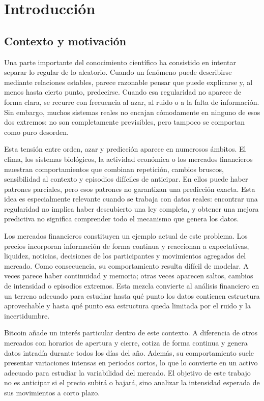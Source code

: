 
\chapter{Introducción}\label{cap:introduccion}

\section{Contexto y motivación}\label{sec:contexto-motivacion}

Una parte importante del conocimiento científico ha consistido en intentar separar lo regular de lo aleatorio. Cuando un fenómeno puede describirse mediante relaciones estables, parece razonable pensar que puede explicarse y, al menos hasta cierto punto, predecirse. Cuando esa regularidad no aparece de forma clara, se recurre con frecuencia al azar, al ruido o a la falta de información. Sin embargo, muchos sistemas reales no encajan cómodamente en ninguno de esos dos extremos: no son completamente previsibles, pero tampoco se comportan como puro desorden.

Esta tensión entre orden, azar y predicción aparece en numerosos ámbitos. El clima, los sistemas biológicos, la actividad económica o los mercados financieros muestran comportamientos que combinan repetición, cambios bruscos, sensibilidad al contexto y episodios difíciles de anticipar. En ellos puede haber patrones parciales, pero esos patrones no garantizan una predicción exacta. Esta idea es especialmente relevante cuando se trabaja con datos reales: encontrar una regularidad no implica haber descubierto una ley completa, y obtener una mejora predictiva no significa comprender todo el mecanismo que genera los datos.

Los mercados financieros constituyen un ejemplo actual de este problema. Los precios incorporan información de forma continua y reaccionan a expectativas, liquidez, noticias, decisiones de los participantes y movimientos agregados del mercado. Como consecuencia, su comportamiento resulta difícil de modelar. A veces parece haber continuidad y memoria; otras veces aparecen saltos, cambios de intensidad o episodios extremos. Esta mezcla convierte al análisis financiero en un terreno adecuado para estudiar hasta qué punto los datos contienen estructura aprovechable y hasta qué punto esa estructura queda limitada por el ruido y la incertidumbre.

Bitcoin añade un interés particular dentro de este contexto. A diferencia de otros mercados con horarios de apertura y cierre, cotiza de forma continua y genera datos intradía durante todos los días del año. Además, su comportamiento suele presentar variaciones intensas en periodos cortos, lo que lo convierte en un activo adecuado para estudiar la variabilidad del mercado. El objetivo de este trabajo no es anticipar si el precio subirá o bajará, sino analizar la intensidad esperada de sus movimientos a corto plazo.

